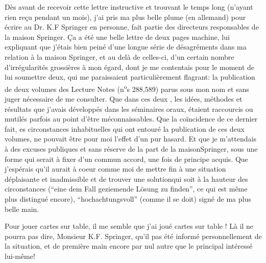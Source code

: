 Dès avant de recevoir cette lettre instructive et trouvant le temps long (n'ayant rien reçu pendant un mois), j'ai pris ma plus belle plume (en allemand) pour écrire au Dr. K.F Springer en personne,  fait partie des directeurs responsables de la maison Springer. Ça a été une belle  lettre de deux pages machine, lui expliquant que j'étais bien peiné d'une longue série de désagréments dans ma relation à la maison Springer, et au delà de celles-ci, d'un certain nombre d'irrégularités grossières à mon égard, dont je me contentais pour le moment de lui soumettre deux, qui me paraissaient particulièrement flagrant: la publication de deux volumes des Lecture Notes (n\textsuperscript{o}s 288,589) parus sous mon nom et sans  juger nécessaire de me consulter. Que dans ces deux , les idées, méthodes et résultats que j'avais développés dans les séminaires oraux, étaient raccourcis ou mutilés parfois au point d'être méconnaissables. Que la coïncidence de ce dernier fait,  es circonstances inhabituelles qui ont entouré la publication de ces deux volumes, ne pouvait être pour moi l'effet d'un pur hasard. Et que je m'attendais à des excuses publiques et sans réserve de la part de la maison\inserted{ }Springer, sous une forme qui serait à fixer d'un commun accord, une fois  de principe  acquis. Que j'espérais qu'il aurait à coeur comme moi de mettre fin à une situation déplaisante et inadmissible et de trouver une solutionqui soit à la hauteur des circonstances (``eine dem Fall geziemende Lösung zu finden'', ce qui  est même plus distingué encore), ``hochachtungsvoll'' (comme il se doit) signé de ma plus belle main.

Pour jouer cartes sur table, il me semble que j'ai joué cartes sur table ! Là il ne pourra pas dire, Monsieur K.F. Springer, qu'il  pas été informé personnellement de la situation, et de première main encore\inserted{,} par nul autre que le principal intéressé lui-même!

